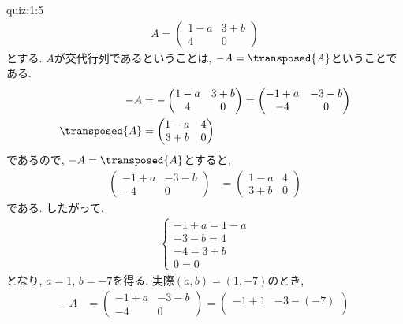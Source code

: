 \begin{answerof}{quiz:1:5}
  \begin{align*}
    A=
    \begin{pmatrix}
      1-a& 3+b\\
      4  &0
    \end{pmatrix}
  \end{align*}
  とする.
  $A$が交代行列であるということは, $-A=\transposed{A}$ということである.
  \begin{align*}
    -A&=
    -\begin{pmatrix}
      1-a& 3+b\\
      4  &0
    \end{pmatrix}
=    \begin{pmatrix}
      -1+a& -3-b\\
      -4  &0
    \end{pmatrix}\\    
    \transposed{A}&=
    \begin{pmatrix}
      1-a& 4\\
      3+b &0
    \end{pmatrix}
  \end{align*}
  であるので, $-A=\transposed{A}$とすると,
  \begin{align*}
    \begin{pmatrix}
      -1+a& -3-b\\
      -4  &0
    \end{pmatrix}&=
    \begin{pmatrix}
      1-a& 4\\
      3+b &0
    \end{pmatrix}
  \end{align*}
  である.
  したがって, 
  \begin{align*}
    \begin{cases}
      -1+a=1-a\\
      -3-b=4\\
      -4=3+b\\
      0=0
    \end{cases}
  \end{align*}
  となり, $a=1$, $b=-7$を得る.
  実際$(a,b)=(1,-7)$のとき,
  \begin{align*}
    -A&=
    \begin{pmatrix}
      -1+a& -3-b\\
      -4  &0
    \end{pmatrix}
    =
    \begin{pmatrix}
      -1+1& -3-(-7)\\

\end{pmatrix}
\end{align*}
\end{answerof}
